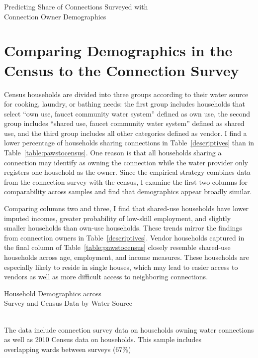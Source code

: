 \documentclass[12pt]{article}
\begin{document}
\begin{appendices}
\begin{table}
\centering
\caption{ Predicting Share of Connections Surveyed with \\ Connection Owner Demographics }\label{table:pawssampling}

\end{table}




\section{Comparing Demographics in the Census to the Connection Survey}\label{appendix:pawstocensus}

Census households are divided into three groups according to their water source for cooking, laundry, or bathing needs: the first group includes households that select ``own use, faucet community water system'' defined as own use, the second group includes ``shared use, faucet community water system'' defined as shared use, and the third group includes all other categories defined as vendor.  I find a lower percentage of households sharing connections in Table~\ref{descriptives} than in Table~\ref{table:pawstocensus}.  One reason is that all households sharing a connection may identify as owning the connection while the water provider only registers one household as the owner.  Since the empirical strategy combines data from the connection survey with the census, I examine the first two columns for comparability across samples and find that demographics appear broadly similar.

Comparing columns two and three, I find that shared-use households have lower imputed incomes, greater probability of low-skill employment, and slightly smaller households than own-use households.  These trends mirror the findings from connection owners in Table~\ref{descriptives}.  Vendor households captured in the final column of Table~\ref{table:pawstocensus} closely resemble shared-use households across age, employment, and income measures.  These households are especially likely to reside in single houses, which may lead to easier access to vendors as well as more difficult access to neighboring connections.

\begin{table}
\centering
\caption{Household Demographics across \\ Survey and Census Data by Water Source}\label{table:pawstocensus}
 \\
\footnotesize{The data include connection survey data on households owning water connections \\ as well as 2010 Census data on households. This sample includes \\ overlapping wards between  surveys (67\%)}
\end{table}



\end{appendices}
\end{document}
